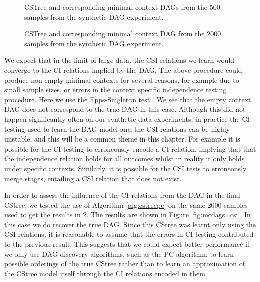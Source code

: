 \documentclass{tufte-book}
\begin{document}
\begin{figure}[!h]\label{fig:mc_dags500}
   \begin{floatrow}
%
 \caption{CSTree and corresponding minimal context DAGs from the 500 samples from the synthetic DAG experiment.}
        
   \end{floatrow}
\end{figure}


\begin{figure}[!h]\label{fig:mc_dags2000}
   \begin{floatrow}
%
 \caption{CSTree and corresponding minimal context DAG from the 2000 samples from the synthetic DAG experiment.}
        
   \end{floatrow}
\end{figure}


We expect that in the limit of large data, the CSI relations we learn would converge to the CI relations implied by the DAG. The above procedure could produce non empty minimal contexts for several reasons, for example due to small sample sizes, or errors in the context specific independence testing procedure. Here we use the Epps-Singleton test \cite{epps-1986-omnib-test}. We see that the empty context DAG does not correspond to the true DAG in this case. Although this did not happen significantly often on our synthetic data experiments, in practice the CI testing used to learn the DAG model and the CSI relations can be highly unstable, and this will be a common theme in this chapter. For example it is possible for the CI testing to erroneously encode a CI relation, implying that that the independence relation holds for all outcomes whilst in reality it only holds under specific contexts. Similarly, it is possible for the CSI tests to erroneously merge stages, entailing a CSI relation that does not exist. 


In order to assess the influence of the CI relations from the DAG in the final CStree, we tested the use of Algorithm \ref{alg:cstreepc} on the same 2000 samples used to get the results in \ref{fig:mc_dags2000}. The results are shown in Figure \ref{fig:mcdags_csi}. In this case we do recover the true DAG. Since this CStree was learnt only using the CSI relations, it is reasonable to assume that the errors in CI testing contributed to the previous result. This suggests that we could expect better performance if we only use DAG discovery algorithms, such as the PC algorithm, to learn possible orderings of the true CStree rather than to learn an approximation of the CStree model itself through the CI relations encoded in them.
\end{document}
